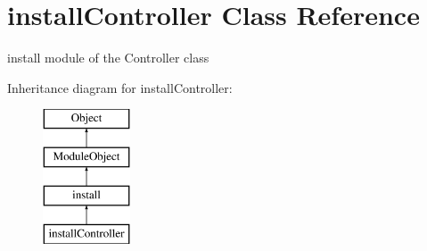 \hypertarget{classinstallController}{\section{install\+Controller Class Reference}
\label{classinstallController}
}


install module of the Controller class  


Inheritance diagram for install\+Controller\+:\begin{figure}[H]
\begin{center}
\leavevmode
\includegraphics[height=4.000000cm]{classinstallController}
\end{center}
\end{figure}
